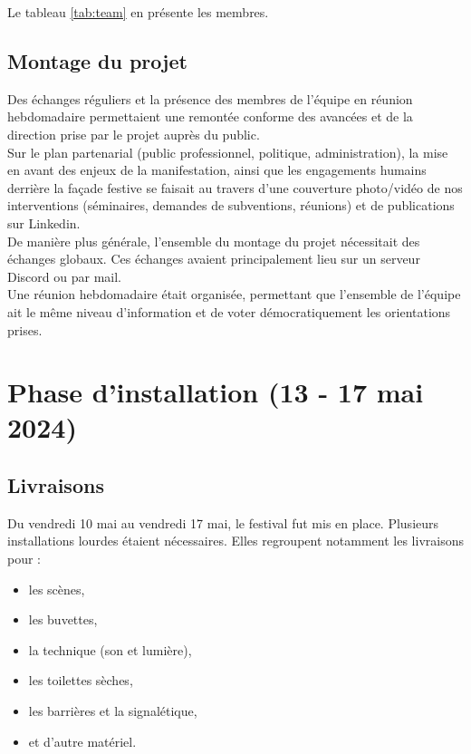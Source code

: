 \documentclass[12pt,a4paper]{report}
\begin{document}
Le tableau \ref{tab:team} en présente les membres.

\subsection{Montage du projet}

Des échanges réguliers et la présence des membres de l'équipe en réunion hebdomadaire permettaient une remontée conforme des avancées et de la direction prise par le projet auprès du public.\\

Sur le plan partenarial (public professionnel, politique, administration), la mise en avant des enjeux de la manifestation, ainsi que les engagements humains derrière la façade festive se faisait au travers d'une couverture photo/vidéo de nos interventions (séminaires, demandes de subventions, réunions) et de publications sur Linkedin.\\

De manière plus générale, l'ensemble du montage du projet nécessitait des échanges globaux. Ces échanges avaient principalement lieu sur un serveur Discord ou par mail.\\

Une réunion hebdomadaire était organisée, permettant que l'ensemble de l'équipe ait le même niveau d'information et de voter démocratiquement les orientations prises.


\section{Phase d'installation (13 - 17 mai 2024)}

\subsection{Livraisons}

Du vendredi 10 mai au vendredi 17 mai, le festival fut mis en place. Plusieurs installations lourdes étaient nécessaires. Elles regroupent notamment les livraisons pour : 
\begin{itemize}
\item les scènes,
\item les buvettes,
\item la technique (son et lumière),
\item les toilettes sèches, 
\item les barrières et la signalétique,
\item et d'autre matériel.
\end{itemize}
\end{document}
